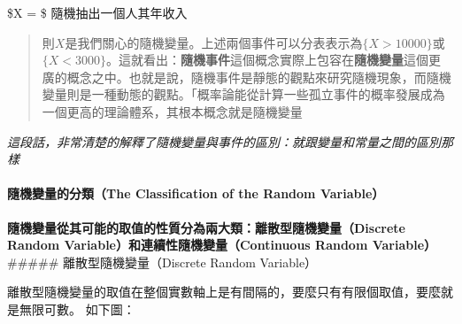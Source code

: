 \documentclass[11pt]{article}
\begin{document}
\$X = \$ 隨機抽出一個人其年收入

\begin{quote}
則\(X\)是我們關心的隨機變量。上述兩個事件可以分表表示為\(\{X > 10000\}\)或\(\{X < 3000\}\)。這就看出：\textbf{隨機事件}這個概念實際上包容在\textbf{隨機變量}這個更廣的概念之中。也就是說，隨機事件是靜態的觀點來研究隨機現象，而隨機變量則是一種動態的觀點。「概率論能從計算一些孤立事件的概率發展成為一個更高的理論體系，其根本概念就是隨機變量
\end{quote}

\emph{這段話，非常清楚的解釋了隨機變量與事件的區別：就跟變量和常量之間的區別那樣}

    \hypertarget{ux96a8ux6a5fux8b8aux91cfux7684ux5206ux985ethe-classification-of-the-random-variable}{%
\paragraph{隨機變量的分類（The Classification of the Random
Variable）}\label{ux96a8ux6a5fux8b8aux91cfux7684ux5206ux985ethe-classification-of-the-random-variable}}

\textbf{隨機變量從其可能的取值的性質分為兩大類：離散型隨機變量（Discrete
Random Variable）和連續性隨機變量（Continuous Random Variable）}
\#\#\#\#\# 離散型隨機變量（Discrete Random Variable）

離散型隨機變量的取值在整個實數軸上是有間隔的，要麼只有有限個取值，要麼就是無限可數。
如下圖：
\end{document}
